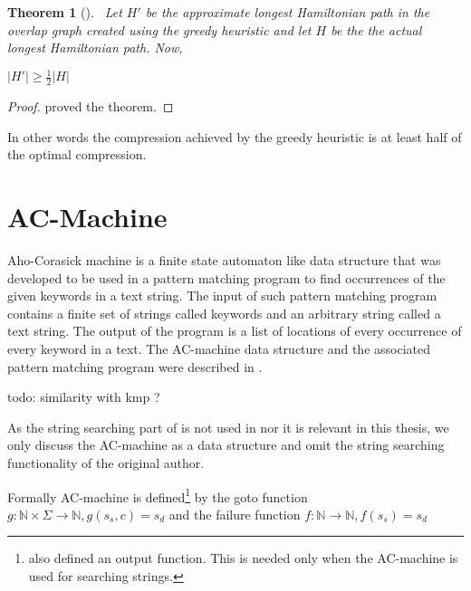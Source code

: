 \documentclass[english,twoside,censored,csm,algorithms-track-2020]{HYthesisML}
\theoremstyle{plain}
\newtheorem{theorem}{Theorem}[chapter]
\theoremstyle{definition}
\begin{document}

\begin{theorem}[]~\label{theorem-heuristic-bound}
  Let $H'$ be the approximate longest Hamiltonian path in the overlap graph created using
  the greedy heuristic and let $H$ be the the actual longest Hamiltonian path. Now,
  
  $|H'|\geq \frac{1}{2}|H|$
  
\end{theorem}
\begin{proof}
  \citep{Tarhio88} proved the theorem.
\end{proof}

In other words the compression achieved by the greedy heuristic is at least half of the optimal
compression. 




\section{AC-Machine}


  
  Aho-Corasick machine is a finite state automaton like data structure that was developed to be used
  in a pattern matching program to find occurrences of the given keywords in a text string. \citep{Aho75}
  The input of such pattern matching program contains a finite set of strings called keywords and an
  arbitrary string called a text string. The output of the program is a list of locations of every
  occurrence of every keyword in a text. The AC-machine data structure and the associated pattern
  matching program were described in \citep{Aho75}.

  todo: similarity with kmp ?

  As the string searching part of \citep{Aho75} is not used in \citep{Ukkonen90} nor it is relevant in
  this thesis, we only discuss the AC-machine as a data structure and omit the string searching
  functionality of the original author.

  Formally AC-machine is defined\footnote{\citep{Aho75} also defined an output function.
  This is needed only when the AC-machine is used for searching strings.} by the goto function
  $g : \mathbb{N} \times \Sigma \rightarrow \mathbb{N}, g(s_s,c) = s_d$ and the failure function
  $f : \mathbb{N} \rightarrow \mathbb{N}, f(s_s) = s_d$
\end{document}
